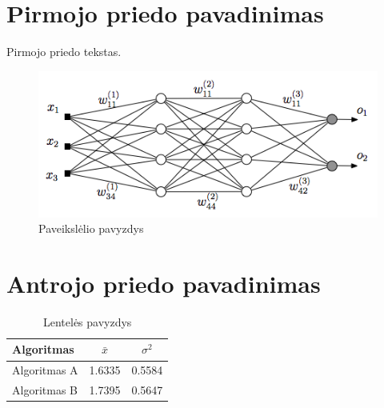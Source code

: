 \documentclass[fleqn]{VUMIFKompMagistrinis}
\begin{document}
\section{Pirmojo priedo pavadinimas}
Pirmojo priedo tekstas.
\begin{figure}[H]
    \centering
    \includegraphics[scale=0.5]{src/img/MLP}
    \caption{Paveikslėlio pavyzdys}
    \label{img:mlp}
\end{figure}


\section{Antrojo priedo pavadinimas}
\begin{table}[H]\footnotesize
  \centering
  \caption{Lentelės pavyzdys}
  \begin{tabular}{|l|c|c|} \hline
    Algoritmas    & $\bar{x}$ & $\sigma^{2}$ \\
    \hline
    Algoritmas A  & 1.6335    & 0.5584 \\
    Algoritmas B  & 1.7395    & 0.5647 \\
    \hline
  \end{tabular}
  \label{tab:table example}
\end{table}
\end{document}
